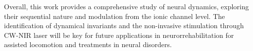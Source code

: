 Overall, this work provides a comprehensive study of neural dynamics, exploring their sequential nature and modulation from the ionic channel level. The identification of dynamical invariants and the non-invasive stimulation through CW-NIR laser will be key for future applications in neurorrehabilitation for assisted locomotion and treatments in neural disorders.
